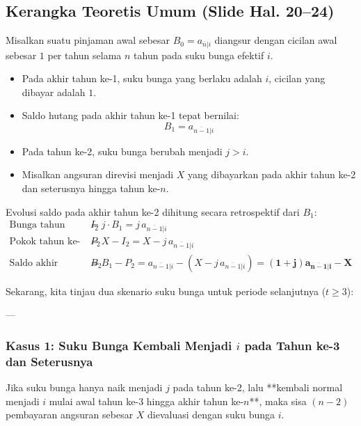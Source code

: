 \documentclass[11pt,a4paper]{article}
\begin{document}
\subsection{Kerangka Teoretis Umum (Slide Hal. 20--24)}

Misalkan suatu pinjaman awal sebesar $B_0 = a_{\overline{n}|i}$ diangsur dengan cicilan awal sebesar $1$ per tahun selama $n$ tahun pada suku bunga efektif $i$.
\begin{itemize}
    \item Pada akhir tahun ke-1, suku bunga yang berlaku adalah $i$, cicilan yang dibayar adalah $1$.
    \item Saldo hutang pada akhir tahun ke-1 tepat bernilai:
    \begin{equation}
        B_1 = a_{\overline{n-1}|i}
    \end{equation}
    \item Pada tahun ke-2, suku bunga berubah menjadi $j > i$.
    \item Misalkan angsuran direvisi menjadi $X$ yang dibayarkan pada akhir tahun ke-2 dan seterusnya hingga tahun ke-$n$.
\end{itemize}

Evolusi saldo pada akhir tahun ke-2 dihitung secara retrospektif dari $B_1$:
\begin{align}
    \text{Bunga tahun ke-2:} \quad I_2 &= j \cdot B_1 = j \, a_{\overline{n-1}|i} \\
    \text{Pokok tahun ke-2:} \quad P_2 &= X - I_2 = X - j \, a_{\overline{n-1}|i} \\
    \text{Saldo akhir tahun ke-2:} \quad B_2 &= B_1 - P_2 = a_{\overline{n-1}|i} - (X - j \, a_{\overline{n-1}|i}) = \mathbf{(1+j) a_{\overline{n-1}|i} - X}
\end{align}

Sekarang, kita tinjau dua skenario suku bunga untuk periode selanjutnya ($t \ge 3$):

---

\subsubsection{Kasus 1: Suku Bunga Kembali Menjadi \texorpdfstring{$i$}{i} pada Tahun ke-3 dan Seterusnya}

Jika suku bunga hanya naik menjadi $j$ pada tahun ke-2, lalu **kembali normal menjadi $i$ mulai awal tahun ke-3 hingga akhir tahun ke-$n$**, maka sisa $(n-2)$ pembayaran angsuran sebesar $X$ dievaluasi dengan suku bunga $i$.
\end{document}
